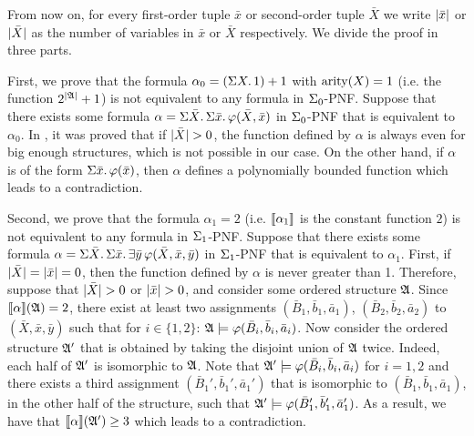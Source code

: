 
From now on, for every first-order tuple $\bar{x}$ or second-order tuple $\bar{X}$ we write $\vert \bar{x} \vert$ or $\vert \bar{X} \vert$ as the number of variables in $\bar{x}$ or $\bar{X}$ respectively. 
We divide the proof in three parts.

First, we prove that the formula $\alpha_{0} = \left( \Sigma{X}.\, 1 \right) + 1$ with ${\rm arity}(X) = 1$ (i.e. the function $2^{\vert\mathfrak{A}\vert}+1$) is not equivalent to any formula in $\Sigma_{0}$-PNF. Suppose that there exists some formula $\alpha = \Sigma{\bar{X}}.\,\Sigma{\bar{x}}.\,\varphi(\bar{X},\bar{x})$ in $\Sigma_{0}$-PNF that is equivalent to $\alpha_0$.
In \cite{SalujaST95}, it was proved that if $\vert \bar{X} \vert > 0$, the function defined by $\alpha$ is always even for big enough structures, which is not possible in our case.
On the other hand, if $\alpha$ is of the form $\Sigma{\bar{x}}.\,\varphi(\bar{x})$, then $\alpha$ defines a polynomially bounded function which leads to a contradiction.

Second, we prove that the formula $\alpha_{1} = 2$ (i.e. ${\llbracket{}{\alpha_{1}}\rrbracket}$ is the constant function $2$) is not equivalent to any formula in $\Sigma_{1}$-PNF. 
Suppose that there exists some formula $\alpha = \Sigma{\bar{X}}.\,\Sigma{\bar{x}}.\,\exists\bar{y}\, \varphi(\bar{X},\bar{x},\bar{y})$ in $\Sigma_{1}$-PNF that is equivalent to $\alpha_1$. 
First, if $\vert \bar{X} \vert = \vert \bar{x} \vert = 0$, then the function defined by $\alpha$ is never greater than 1. 
Therefore, suppose that $\vert \bar{X} \vert > 0$ or $\vert \bar{x} \vert > 0$, and consider some ordered structure $\mathfrak{A}$. 
Since ${\llbracket{}{\alpha}\rrbracket}(\mathfrak{A}) = 2$, there exist at least two assignments $(\bar{B}_1,\bar{b}_1,\bar{a}_1)$, $(\bar{B}_2,\bar{b}_2,\bar{a}_2)$ to $(\bar{X},\bar{x},\bar{y})$ such that for $i\in\{1,2\}$: $\mathfrak{A}\models\varphi(\bar{B}_i,\bar{b}_i,\bar{a}_i)$. 
Now consider the ordered structure $\mathfrak{A}'$ that is obtained by taking the disjoint union of $\mathfrak{A}$ twice. 
Indeed, each half of $\mathfrak{A}'$ is isomorphic to $\mathfrak{A}$. 
Note that $\mathfrak{A}'\models\varphi(\bar{B}_i,\bar{b}_i,\bar{a}_i)$ for $i = 1,2$ and there exists a third assignment $(\bar{B}_1',\bar{b}_1',\bar{a}_1')$ that is isomorphic to $(\bar{B}_1,\bar{b}_1,\bar{a}_1)$, in the other half of the structure, such that $\mathfrak{A}'\models\varphi(\bar{B}_1',\bar{b}_1',\bar{a}_1')$. 
As a result, we have that ${\llbracket{}{\alpha}\rrbracket}(\mathfrak{A}') \geq 3$ which leads to a contradiction.

